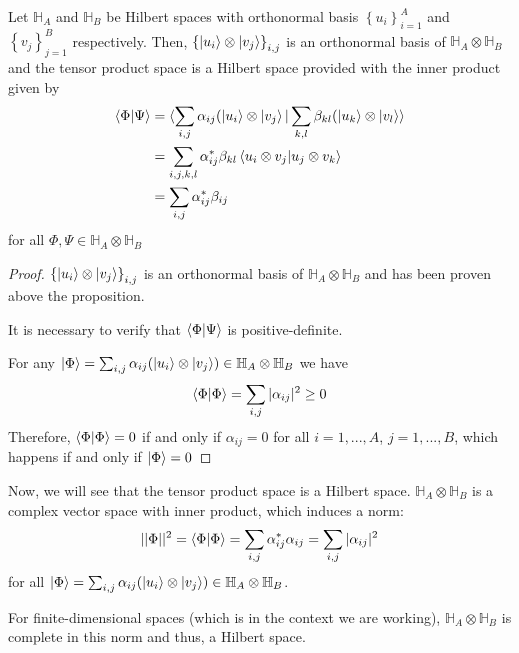 \begin{proposicion}
    Let $\mathbb{H}_A$ and $\mathbb{H}_B$ be Hilbert spaces with orthonormal basis $\left\lbrace u_i \right\rbrace_{i=1}^A$ and $\left \lbrace v_j \right\rbrace_{j=1}^B$ respectively. Then, $\left\lbrace \ket{u_i} \otimes \ket{v_j} \right\rbrace_{i,j}$ is an orthonormal basis of  $\mathbb{H}_A \otimes \mathbb{H}_B$  and the tensor product space is a Hilbert space provided with the inner product given by
    \begin{align}
        \braket{\Phi| \Psi} &= \braket{\sum_{i,j}\alpha_{ij} (\ket{u_i} \otimes \ket{v_j} | \sum_{k,l}\beta_{kl} (\ket{u_k} \otimes \ket{v_l}} \\
        &= \sum_{i,j,k,l} \alpha_{ij}^* \beta_{kl}\braket{u_i \otimes v_j | u_j \otimes v_k} \\
        &= \sum_{i,j} \alpha_{ij}^* \beta_{ij}
    \end{align}
    for all $\Phi, \Psi \in \mathbb{H}_A \otimes \mathbb{H}_B$ 
\end{proposicion}
\begin{proof}
    $\left\lbrace \ket{u_i} \otimes \ket{v_j} \right\rbrace_{i,j}$ is an orthonormal basis of  $\mathbb{H}_A \otimes \mathbb{H}_B$  and has been proven above the proposition.

    It is necessary to verify that $\braket{\Phi| \Psi}$ is positive-definite.

    For any $\ket{\Phi} = \sum_{i,j}\alpha_{ij} (\ket{u_i} \otimes \ket{v_j}) \in \mathbb{H}_A \otimes \mathbb{H}_B$ we have
    $$\braket{\Phi |\Phi} = \sum_{i,j} |\alpha_{ij}|^2 \geq 0$$
    Therefore, $\braket{\Phi |\Phi} = 0$ if and only if $\alpha_{ij}=0$ for all $i=1,...,A$, $j=1,...,B$, which happens if and only if $\ket{\Phi} = 0$
\end{proof}

Now, we will see that the tensor product space is a Hilbert space.  $\mathbb{H}_A \otimes \mathbb{H}_B$ is a complex vector space with inner product, which induces a norm:
$$|| \Phi ||^2 = \braket{\Phi | \Phi} = \sum_{i,j} \alpha_{ij}^* \alpha_{ij} = \sum_{i,j} |\alpha_{ij}|^2 $$
for all $\ket{\Phi}= \sum_{i,j} \alpha_{ij} (\ket{u_i} \otimes \ket{v_j}) \in  \mathbb{H}_A \otimes \mathbb{H}_B$.

For finite-dimensional spaces (which is in the context we are working),  $\mathbb{H}_A \otimes \mathbb{H}_B$ is complete in this norm and thus, a Hilbert space. 


